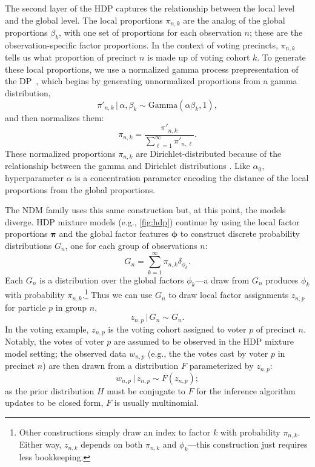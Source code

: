 \documentclass[twoside,11pt]{article}
\newcommand{\g}{\, | \,}
\begin{document}
The second layer of the HDP captures the relationship between the local level and the global level.
The local proportions $\pi_{n,k}$ are the analog of the global proportions $\beta_k$, with one set of proportions for each observation $n$; these are the observation-specific factor proportions. In the context of voting precincts, $\pi_{n,k}$ tells us what proportion of precinct $n$ is made up of voting cohort $k$.
To generate these local proportions, we use a normalized gamma process prepresentation of the DP~\citep{Ferguson:1973, Paisley:2012}, which begins by generating unnormalized proportions from a gamma distribution,
\begin{equation}\pi'_{n,k} \g \alpha, \beta_k \sim \mbox{Gamma}(\alpha \beta_k, 1), \label{eq:unnormalizedPi}\end{equation}
and then normalizes them:
\begin{equation}\pi_{n,k} = \frac {\pi'_{n,k}} {\sum_{\ell=1}^{\infty} \pi'_{n, \ell}}. \label{eq:normalizedPi}\end{equation}
These normalized proportions $\pi_{n,k}$ are Dirichlet-distributed because of the relationship between the gamma and Dirichlet distributions \cite{Ferguson:1973}.
Like $\alpha_0$, hyperparameter $\alpha$ is a concentration parameter encoding the distance of the local proportions from the global proportions. 

The NDM family uses this same construction but, at this point, the models diverge.  HDP mixture models 
(e.g., \cref{fig:hdp}) continue by using the local factor proportions $\boldsymbol{\pi}$ and the global factor features $\boldsymbol{\phi}$ to construct discrete probability distributions $G_n$, one for each group of observations $n$:
\begin{equation}
G_n = \sum_{k=1}^\infty \pi_{n,k} \delta_{\phi_k}.
\end{equation}
Each $G_n$ is a distribution over the global factors $\phi_k$---a draw from $G_n$ produces $\phi_k$ with probability $\pi_{n,k}$.\footnote{Other constructions simply draw an index to factor $k$ with probability $\pi_{n,k}$.  Either way, $z_{n,k}$ depends on both $\pi_{n,k}$ and $\phi_k$---this construction just requires less bookkeeping.}
Thus we can use $G_n$ to draw local factor assignments $z_{n,p}$ for particle $p$ in group $n$,
\begin{equation}z_{n,p} \g G_n \sim G_n.\end{equation}
In the voting example, $z_{n,p}$ is the voting cohort assigned to voter $p$ of precinct $n$.  Notably, the votes of voter $p$ are assumed to be observed in the HDP mixture model setting; the observed data $w_{n,p}$ (e.g., the the votes cast by voter $p$ in precinct $n$) are then drawn from a distribution $F$ parameterized by $z_{n,p}$:
\begin{equation}
w_{n,p} \g z_{n,p} \sim F(z_{n,p});
\end{equation}
as the prior distribution $H$ must be conjugate to $F$ for the inference algorithm updates to be closed form, $F$ is usually multinomial.
\end{document}
